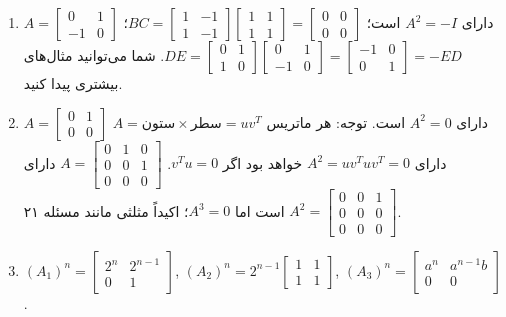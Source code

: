 \documentclass[12pt,a4paper]{article}
\begin{document}
{\begin{enumerate}
			\item $A = \begin{bmatrix} 0 & 1 \\ -1 & 0 \end{bmatrix}$ دارای $A^2=-I$ است؛ $BC = \begin{bmatrix} 1 & -1 \\ 1 & -1 \end{bmatrix} \begin{bmatrix} 1 & 1 \\ 1 & 1 \end{bmatrix} = \begin{bmatrix} 0 & 0 \\ 0 & 0 \end{bmatrix}$؛ $DE = \begin{bmatrix} 0 & 1 \\ 1 & 0 \end{bmatrix} \begin{bmatrix} 0 & 1 \\ -1 & 0 \end{bmatrix} = \begin{bmatrix} -1 & 0 \\ 0 & 1 \end{bmatrix} = -ED$. شما می‌توانید مثال‌های بیشتری پیدا کنید.
			
			\item $A = \begin{bmatrix} 0 & 1 \\ 0 & 0 \end{bmatrix}$ دارای $A^2=0$ است. توجه: هر ماتریس $A = \text{ستون} \times \text{سطر} = uv^T$ دارای $A^2=uv^Tuv^T=0$ خواهد بود اگر $v^Tu=0$. $A = \begin{bmatrix} 0 & 1 & 0 \\ 0 & 0 & 1 \\ 0 & 0 & 0 \end{bmatrix}$ دارای $A^2 = \begin{bmatrix} 0 & 0 & 1 \\ 0 & 0 & 0 \\ 0 & 0 & 0 \end{bmatrix}$ است اما $A^3=0$؛ اکیداً مثلثی مانند مسئله ۲۱.
			
			\item $(A_1)^n = \begin{bmatrix} 2^n & 2^{n-1} \\ 0 & 1 \end{bmatrix}$, $(A_2)^n = 2^{n-1}\begin{bmatrix} 1 & 1 \\ 1 & 1 \end{bmatrix}$, $(A_3)^n = \begin{bmatrix} a^n & a^{n-1}b \\ 0 & 0 \end{bmatrix}$.
			

\end{enumerate}}
\end{document}
